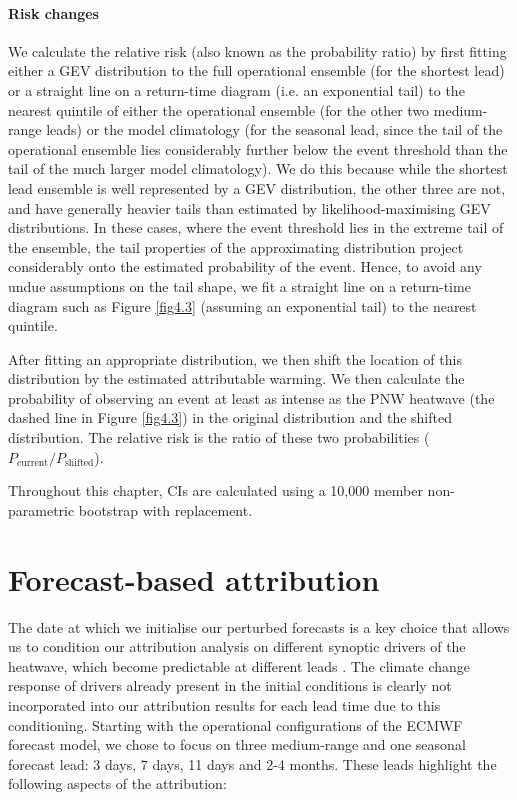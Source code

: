     \paragraph*{Risk changes}
  
      We calculate the relative risk (also known as the probability ratio) by first fitting either a GEV distribution to the full operational ensemble (for the shortest lead) or a straight line on a return-time diagram (i.e. an exponential tail) to the nearest quintile of either the operational ensemble (for the other two medium-range leads) or the model climatology (for the seasonal lead, since the tail of the operational ensemble lies considerably further below the event threshold than the tail of the much larger model climatology). We do this because while the shortest lead ensemble is well represented by a GEV distribution, the other three are not, and have generally heavier tails than estimated by likelihood-maximising GEV distributions. In these cases, where the event threshold lies in the extreme tail of the ensemble, the tail properties of the approximating distribution project considerably onto the estimated probability of the event. Hence, to avoid any undue assumptions on the tail shape, we fit a straight line on a return-time diagram such as Figure \ref{fig4.3} (assuming an exponential tail) to the nearest quintile. 
  
      After fitting an appropriate distribution, we then shift the location of this distribution by the estimated attributable warming. We then calculate the probability of observing an event at least as intense as the PNW heatwave (the dashed line in Figure \ref{fig4.3}) in the original distribution and the shifted distribution. The relative risk is the ratio of these two probabilities ($P_\text{current} / P_\text{shifted}$).
  
      Throughout this chapter, CIs are calculated using a 10,000 member non-parametric bootstrap with replacement.

\section{Forecast-based attribution}\label{ch4:attribution}

  The date at which we initialise our perturbed forecasts is a key choice that allows us to condition our attribution analysis on different synoptic drivers of the heatwave, which become predictable at different leads \cite{lin_2021_2022,mo_anomalous_2022}. The climate change response of drivers already present in the initial conditions is clearly not incorporated into our attribution results for each lead time due to this conditioning. Starting with the operational configurations of the ECMWF forecast model, we chose to focus on three medium-range and one seasonal forecast lead: 3 days, 7 days, 11 days and 2-4 months. These leads highlight the following aspects of the attribution: 

